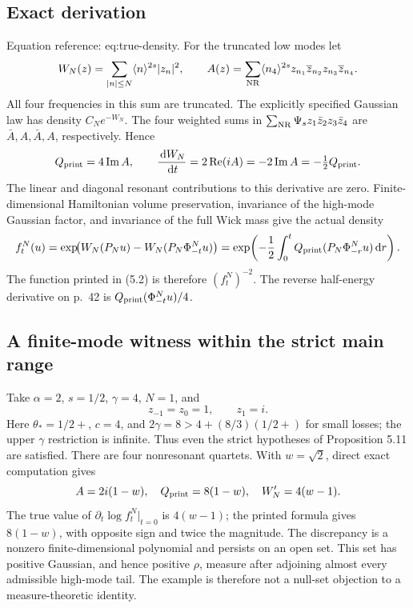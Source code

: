 \documentclass[10pt]{article}
\begin{document}
\subsection*{Exact derivation}
Equation reference: eq:true-density. For the truncated low modes let \[W_N(z)=\sum_{|n|\le N}\langle n\rangle^{2s}|z_n|^2,\qquad
 A(z)=\sum_{\rm NR}\langle n_4\rangle^{2s}
       z_{n_1}\overline z_{n_2}z_{n_3}\overline z_{n_4}.\] All four frequencies in this sum are truncated. The explicitly specified Gaussian law has density \(C_Ne^{-W_N}\). The four weighted sums in \(\sum_{\rm NR}\Psi_s z_1\bar z_2z_3\bar z_4\) are \(\bar A,A,\bar A,A\), respectively. Hence \[Q_{\rm print}=4\operatorname{Im}A,\qquad
 \frac{\,\mathrm dW_N}{\,\mathrm dt}
 =2\operatorname{Re}(iA)=-2\operatorname{Im}A
 =-\tfrac12 Q_{\rm print}.\] The linear and diagonal resonant contributions to this derivative are zero. Finite-dimensional Hamiltonian volume preservation, invariance of the high-mode Gaussian factor, and invariance of the full Wick mass give the actual density \[f_t^N(u)=
 \exp\!\bigl(W_N(P_Nu)-W_N(P_N\Phi_{-t}^Nu)\bigr)
 =
 \exp\!\left(-\frac12\int_0^t
 Q_{\rm print}(P_N\Phi_{-r}^Nu)\,\mathrm dr\right).
 \] The function printed in (5.2) is therefore \((f_t^N)^{-2}\). The reverse half-energy derivative on p. 42 is \(Q_{\rm print}(\Phi_{-t}^Nu)/4\).\par
\subsection*{A finite-mode witness within the strict main range}
Take \(\alpha=2\), \(s=1/2\), \(\gamma=4\), \(N=1\), and \[z_{-1}=z_0=1,\qquad z_1=i.\] Here \(\theta_*=1/2+\), \(c=4\), and \(2\gamma=8>4+(8/3)(1/2+)\) for small losses; the upper \(\gamma\) restriction is infinite. Thus even the strict hypotheses of Proposition 5.11 are satisfied. There are four nonresonant quartets. With \(w=\sqrt2\), direct exact computation gives \[A=2i(1-w),\quad Q_{\rm print}=8(1-w),\quad
 W_N'=4(w-1).\] The true value of \(\partial_t\log f_t^N|_{t=0}\) is \(4(w-1)\); the printed formula gives \(8(1-w)\), with opposite sign and twice the magnitude. The discrepancy is a nonzero finite-dimensional polynomial and persists on an open set. This set has positive Gaussian, and hence positive \(\rho\), measure after adjoining almost every admissible high-mode tail. The example is therefore not a null-set objection to a measure-theoretic identity.\par
\end{document}
